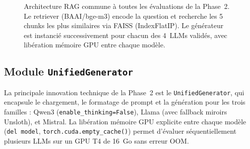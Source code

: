 \documentclass[12pt,a4paper]{article}
\begin{document}
\begin{figure}[H]
\centering
{}
\caption{Architecture RAG commune \`a toutes les \'evaluations de la Phase~2. Le retriever
  (BAAI/bge-m3) encode la question et recherche les 5 chunks les plus similaires via FAISS
  (IndexFlatIP). Le g\'en\'erateur est instanci\'e successivement pour chacun des 4~LLMs
  valid\'es, avec lib\'eration m\'emoire GPU entre chaque mod\`ele.}
\label{fig:architecture}
\end{figure}

\subsection{Module \texttt{UnifiedGenerator}}

La principale innovation technique de la Phase~2 est le \texttt{UnifiedGenerator}, qui
encapsule le chargement, le formatage de prompt et la g\'en\'eration pour les trois familles :
Qwen3 (\texttt{enable\_thinking=False}), Llama (avec fallback miroirs Unsloth), et Mistral.
La lib\'eration m\'emoire GPU explicite entre chaque mod\`ele (\texttt{del model},
\texttt{torch.cuda.empty\_cache()}) permet d'\'evaluer s\'equentiellement plusieurs LLMs
sur un GPU T4 de 16~Go sans erreur OOM.
\end{document}
